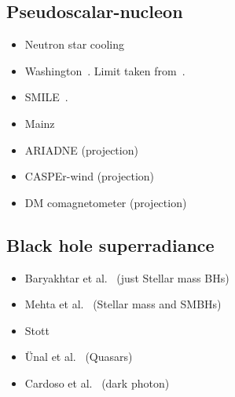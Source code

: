 \documentclass[11pt,twocolumn]{extarticle}
\begin{document}
\begin{mdframed}
\subsection*{Pseudoscalar-nucleon}\vspace{-0.5em}
\begin{itemize}\setlength\itemsep{-0.5em}
	\item Neutron star cooling~\cite{Beznogov:2018fda}
    \item Washington~\cite{Venema:1992zz}. Limit taken from~\cite{Safronova:2017xyt}.
    \item SMILE~\cite{Lee:2018vaq}.
    \item Mainz~\cite{Tullney:2013wqa}
    \item ARIADNE (projection)~\cite{Arvanitaki:2014dfa}
    \item CASPEr-wind (projection)~\cite{JacksonKimball:2017elr}
    \item DM comagnetometer (projection)~\cite{Bloch:2019lcy}
\end{itemize}
\end{mdframed}

\begin{mdframed}
\vspace{-1em}
\section{Black hole superradiance}\vspace{-0.5em}
\begin{itemize}\setlength\itemsep{-0.5em}
	\item Baryakhtar et al.~\cite{Baryakhtar:2020gao} (just Stellar mass BHs)
	\item Mehta et al.~\cite{Baryakhtar:2020gao} (Stellar mass and SMBHs)
	\item Stott~\cite{Stott:2020gjj}
	\item \"Unal et al.~\cite{Unal:2020jiy} (Quasars)
	\item Cardoso et al.~\cite{Cardoso:2018tly} (dark photon)
\end{itemize}
\end{mdframed}

\newpage 
\end{document}
